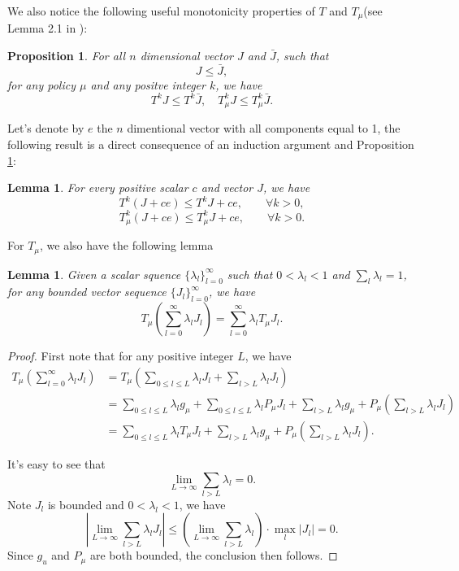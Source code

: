 \documentclass[12pt,a4paper]{amsart}
\numberwithin{equation}{section}
\theoremstyle{plain}
\newtheorem{Lemma}[Th]{Lemma}
\newtheorem{Prop}[Th]{Proposition}
\theoremstyle{definition}
\begin{document}
We also notice the following useful monotonicity properties of $T$ and $T_{\mu}$(see Lemma 2.1 in \cite{BertsekasTsitsiklis96}):
\begin{Prop} \label{mon}
	For all $n$ dimensional vector $J$ and $\bar{J}$, such that
	$$
	J \leq \bar{J},
	$$
	for any  policy $\mu$ and any positve integer $k$, we have
	$$
	T^k J \leq T^k \bar{J}, \quad T_{\mu}^k J \leq T_{\mu}^k \bar{J}.
	$$
\end{Prop}
Let's denote by $e$ the $n$ dimentional vector with all components equal to 1, the following result is a direct consequence of an induction argument and Proposition \ref{mon}:
\begin{Lemma} \label{lmmon}
	For every positive scalar $c$ and vector $J$, we have 
	$$
	T^{k} (J + ce) \leq T^k J + ce, \quad  \quad \forall k > 0,
	$$
	$$
	T_{\mu}^{k} (J + ce) \leq T_{\mu}^k J + ce, \quad  \quad \forall k > 0.
	$$
\end{Lemma}
For $T_{\mu}$, we also have the following lemma
\begin{Lemma} \label{lmtmu}
	Given a scalar squence $\{\lambda_{l} \}_{l=0}^{\infty}$ such that $ 0 < \lambda_l < 1$ and $\sum_{l} \lambda_l = 1$, for any bounded vector sequence $\{J_l\}_{l=0}^{\infty}$, we have
	$$
	T_{\mu} \left(\sum_{l=0}^{\infty} \lambda_l J_l\right) = \sum_{l=0}^{\infty} \lambda_l T_{\mu} J_l.
	$$
\end{Lemma}
\begin{proof}
	First note that for any positive integer $L$, we have
	$$
	\begin{aligned}
	T_{\mu} \left(\sum_{l=0}^{\infty} \lambda_l J_l \right) & = T_{\mu} \left( \sum_{ 0 \le l \le L} \lambda_l J_l + \sum_{l >L} \lambda_l J_l \right) \\
	& = \sum_{0 \le l \le L} \lambda_l g_{\mu} + \sum_{0 \le l \le L} \lambda_l P_{\mu} J_l +  \sum_{l > L} \lambda_l g_{\mu} + P_{\mu} \left( \sum_{l > L} \lambda_l J_l \right) \\
	& = \sum_{ 0 \le l \le L} \lambda_l T_{\mu} J_l + \sum_{l > L} \lambda_l g_{\mu} + P_{\mu} \left( \sum_{l > L} \lambda_l J_l \right) .
	\end{aligned}
	$$
	
	It's easy to see that 
	$$ 
	\lim_{L \to \infty}\sum_{l > L}\lambda_{l} = 0. 
	$$
	Note $J_l$ is bounded and $ 0 < \lambda_{l} < 1$,  we have
	$$
	\left| \lim_{L\to \infty} \sum_{l > L} \lambda_l J_l  \right|  \le  \left( \lim_{L \to \infty} \sum_{l > L} \lambda_{l} \right) \cdot \max_{l} \left|J_l\right|   = 0.
	$$
	Since $g_u$ and $P_{\mu}$ are both bounded, the conclusion then follows. 
\end{proof}
\end{document}
